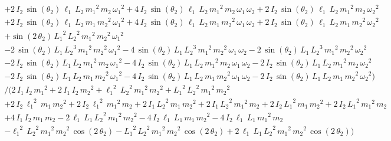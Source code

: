 \documentclass[a4paper,11pt]{jsarticle}
\begin{document}
\begin{align*}
      \\ & & &+
      2\,I_{2}\,\sin\left(\theta_2\right)\,\ell_{1}\,L_2\,{m_{1}}^2\,m_{2}\,{\omega _{1}}^2+
      4\,I_{2}\,\sin\left(\theta_2\right)\,\ell_{1}\,L_2\,{m_{1}}^2\,m_{2}\,\omega _{1}\,\omega _{2}+
      2\,I_{2}\,\sin\left(\theta_2\right)\,\ell_{1}\,L_2\,{m_{1}}^2\,m_{2}\,{\omega _{2}}^2
      \\ & & &+
      2\,I_{2}\,\sin\left(\theta_2\right)\,\ell_{1}\,L_2\,m_{1}\,{m_{2}}^2\,{\omega _{1}}^2+
      4\,I_{2}\,\sin\left(\theta_2\right)\,\ell_{1}\,L_2\,m_{1}\,{m_{2}}^2\,\omega _{1}\,\omega _{2}+
      2\,I_{2}\,\sin\left(\theta_2\right)\,\ell_{1}\,L_2\,m_{1}\,{m_{2}}^2\,{\omega _{2}}^2
      \\ & & &+
      \sin\left(2\,\theta_2\right)\,{L_1}^2\,{L_2}^2\,{m_{1}}^2\,{m_{2}}^2\,{\omega _{1}}^2
      \\ & & &-
      2\,\sin\left(\theta_2\right)\,L_1\,{L_2}^3\,{m_{1}}^2\,{m_{2}}^2\,{\omega _{1}}^2-
      4\,\sin\left(\theta_2\right)\,L_1\,{L_2}^3\,{m_{1}}^2\,{m_{2}}^2\,\omega _{1}\,\omega _{2}-
      2\,\sin\left(\theta_2\right)\,L_1\,{L_2}^3\,{m_{1}}^2\,{m_{2}}^2\,{\omega _{2}}^2
      \\ & & &-
      2\,I_{2}\,\sin\left(\theta_2\right)\,L_1\,L_2\,{m_{1}}^2\,m_{2}\,{\omega _{1}}^2-
      4\,I_{2}\,\sin\left(\theta_2\right)\,L_1\,L_2\,{m_{1}}^2\,m_{2}\,\omega _{1}\,\omega _{2}-
      2\,I_{2}\,\sin\left(\theta_2\right)\,L_1\,L_2\,{m_{1}}^2\,m_{2}\,{\omega _{2}}^2
      \\ & & &-
      2\,I_{2}\,\sin\left(\theta_2\right)\,L_1\,L_2\,m_{1}\,{m_{2}}^2\,{\omega _{1}}^2-
      4\,I_{2}\,\sin\left(\theta_2\right)\,L_1\,L_2\,m_{1}\,{m_{2}}^2\,\omega _{1}\,\omega _{2}-
      2\,I_{2}\,\sin\left(\theta_2\right)\,L_1\,L_2\,m_{1}\,{m_{2}}^2\,{\omega _{2}}^2
    \Bigg)
    \\
    & & &\Bigg/ \Bigg(
      2\,I_{1}\,I_{2}\,{m_{1}}^2+
      2\,I_{1}\,I_{2}\,{m_{2}}^2+
      {\ell_{1}}^2\,{L_2}^2\,{m_{1}}^2\,{m_{2}}^2+
      {L_1}^2\,{L_2}^2\,{m_{1}}^2\,{m_{2}}^2
      \\ & & &+
      2\,I_{2}\,{\ell_{1}}^2\,m_{1}\,{m_{2}}^2+
      2\,I_{2}\,{\ell_{1}}^2\,{m_{1}}^2\,m_{2}+
      2\,I_{1}\,{L_2}^2\,m_{1}\,{m_{2}}^2+
      2\,I_{1}\,{L_2}^2\,{m_{1}}^2\,m_{2}+
      2\,I_{2}\,{L_1}^2\,m_{1}\,{m_{2}}^2+
      2\,I_{2}\,{L_1}^2\,{m_{1}}^2\,m_{2}
      \\ & & &+
      4\,I_{1}\,I_{2}\,m_{1}\,m_{2}-
      2\,\ell_{1}\,L_1\,{L_2}^2\,{m_{1}}^2\,{m_{2}}^2-
      4\,I_{2}\,\ell_{1}\,L_1\,m_{1}\,{m_{2}}^2-
      4\,I_{2}\,\ell_{1}\,L_1\,{m_{1}}^2\,m_{2}
      \\ & & &-
      {\ell_{1}}^2\,{L_2}^2\,{m_{1}}^2\,{m_{2}}^2\,\cos\left(2\,\theta_2\right)-
      {L_1}^2\,{L_2}^2\,{m_{1}}^2\,{m_{2}}^2\,\cos\left(2\,\theta_2\right)+
      2\,\ell_{1}\,L_1\,{L_2}^2\,{m_{1}}^2\,{m_{2}}^2\,\cos\left(2\,\theta_2\right)
    \Bigg)
\end{align*}
\end{document}
